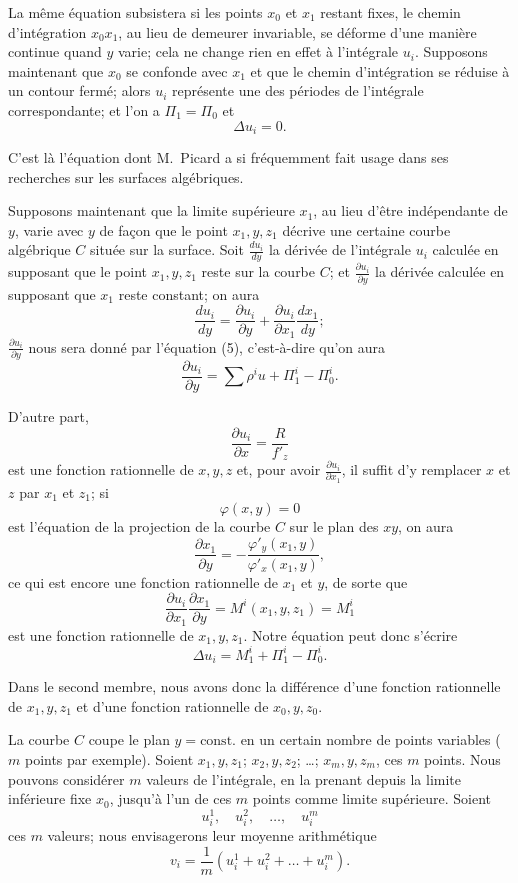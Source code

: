 \documentclass{article}
\begin{document}
La même équation subsistera si les points $x_{0}$ et $x_{1}$ restant fixes, le chemin d'intégration $x_{0}x_{1}$, au lieu de demeurer invariable, se déforme d'une manière continue quand $y$ varie; cela ne change rien en effet à l'intégrale $u_{i}$. Supposons maintenant que $x_{0}$ se confonde avec $x_{1}$ et que le chemin d'intégration se réduise à un contour fermé; alors $u_{i}$ représente une des périodes de l'intégrale correspondante; et l'on a $\Pi_{1} = \Pi_{0}$ et
\[
\Delta u_{i} = 0. \tag{5 b}
\]

C'est là l'équation dont M.~Picard a si fréquemment fait usage dans ses recherches sur les surfaces algébriques.

Supposons maintenant que la limite supérieure $x_{1}$, au lieu d'être indépendante de $y$, varie avec $y$ de façon que le point $x_{1}, y, z_{1}$ décrive une certaine courbe algébrique $C$ située sur la surface. Soit $\displaystyle\frac{du_{i}}{dy}$ la dérivée de l'intégrale $u_{i}$ calculée en supposant que le point $x_{1}, y, z_{1}$ reste sur la courbe $C$; et $\displaystyle\frac{\partial u_{i}}{\partial y}$ la dérivée calculée en supposant que $x_{1}$ reste constant; on aura
\[
\frac{du_{i}}{dy} = \frac{\partial u_{i}}{\partial y} + \frac{\partial u_{i}}{\partial x_{1}} \frac{dx_{1}}{dy};
\]
$\displaystyle\frac{\partial u_{i}}{\partial y}$ nous sera donné par l'équation (5), c'est-à-dire qu'on aura
\[
\frac{\partial u_{i}}{\partial y} = \sum \rho^{i} u + \Pi_{1}^{i} - \Pi_{0}^{i}.
\]

D'autre part,
\[
\frac{\partial u_{i}}{\partial x} = \frac{R}{f'_{z}}
\]
est une fonction rationnelle de $x, y, z$ et, pour avoir $\displaystyle\frac{\partial u_{i}}{\partial x_{1}}$, il suffit d'y remplacer $x$ et $z$ par $x_{1}$ et $z_{1}$; si
\[
\varphi(x, y) = 0
\]
est l'équation de la projection de la courbe $C$ sur le plan des $xy$, on aura
\[
\frac{\partial x_{1}}{\partial y} = - \frac{\varphi'_{y}(x_{1}, y)}{\varphi'_{x}(x_{1}, y)},
\]
ce qui est encore une fonction rationnelle de $x_{1}$ et $y$, de sorte que
\[
\frac{\partial u_{i}}{\partial x_{1}} \frac{\partial x_{1}}{\partial y} = M^{i}(x_{1}, y, z_{1}) = M_{1}^{i}
\]
est une fonction rationnelle de $x_{1}, y, z_{1}$. Notre équation peut donc s'écrire
\[
\Delta u_{i} = M_{1}^{i} + \Pi_{1}^{i} - \Pi_{0}^{i}. \tag{5 c}
\]

Dans le second membre, nous avons donc la différence d'une fonction rationnelle de $x_{1}, y, z_{1}$ et d'une fonction rationnelle de $x_{0}, y, z_{0}$.

La courbe $C$ coupe le plan $y = \text{const.}$ en un certain nombre de points variables ($m$ points par exemple). Soient $x_{1}, y, z_{1}$; $x_{2}, y, z_{2}$; \ldots; $x_{m}, y, z_{m}$, ces $m$ points. Nous pouvons considérer $m$ valeurs de l'intégrale, en la prenant depuis la limite inférieure fixe $x_{0}$, jusqu'à l'un de ces $m$ points comme limite supérieure. Soient
\[
u_{i}^{1}, \quad u_{i}^{2}, \quad \ldots, \quad u_{i}^{m}
\]
ces $m$ valeurs; nous envisagerons leur moyenne arithmétique
\[
v_{i} = \frac{1}{m} (u_{i}^{1} + u_{i}^{2} + \ldots + u_{i}^{m}).
\]
\end{document}
